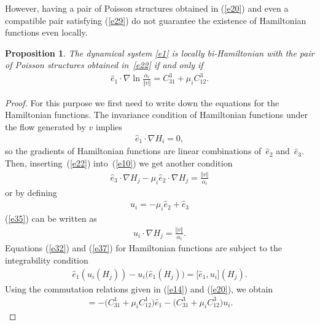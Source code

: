 \documentclass[10pt,a4paper]{amsart}
\numberwithin{equation}{section}
\newtheorem{Proposition}[Theorem]{Proposition}
 { \theoremstyle{definition}
\newtheorem{Definition}[Theorem]{Definition} }
\begin{document}
However, having a pair of Poisson structures obtained in (\ref{e20}) and even a compatible pair satisfying (\ref{e29}) do not guarantee the existence of Hamiltonian functions even locally.

\begin{Proposition}\label{proposition3}
The dynamical system \eqref{e1} is locally bi-Hamiltonian with the pair of Poisson structures obtained in~\eqref{e22} if and only if
\begin{gather}
\widehat{e}_{1}\cdot \nabla \ln \frac{\alpha _{i}}{\Vert v\Vert }=C_{31}^{3}+\mu _{i}C_{12}^{3}. \label{e31}
\end{gather}
\end{Proposition}

\begin{proof}
For this purpose we f\/irst need to write down the equations for the Hamiltonian functions. The invariance condition of Hamiltonian functions under the f\/low generated by $v$ implies
\begin{gather}
\widehat{e}_{1}\cdot \nabla H_{i}=0, \label{e32}
\end{gather}
so the gradients of Hamiltonian functions are linear combinations of~$\widehat{e}_{2}$ and~$\widehat{e}_{3}$. Then, inser\-ting~(\ref{e22}) into~(\ref{e10}) we get another condition
\begin{gather}
\widehat{e}_{3}\cdot \nabla H_{j}-\mu _{i}\widehat{e}_{2}\cdot \nabla H_{j}=\frac{ \Vert v \Vert }{\alpha _{i}} \label{e35}
\end{gather}
or by def\/ining
\begin{gather*}
u_{i}=-\mu _{i}\widehat{e}_{2}+\widehat{e}_{3}
\end{gather*}
(\ref{e35}) can be written as
\begin{gather}
u_{i}\cdot \nabla H_{j}=\frac{\Vert v\Vert }{\alpha _{i}}.\label{e37}
\end{gather}
Equations (\ref{e32}) and (\ref{e37}) for Hamiltonian functions are subject to the integrability condition
\begin{gather*}
\widehat{e}_{1} ( u_{i}(H_{j}) ) -u_{i}\big( \widehat{e}_{1}(H_{j}) \big) =\big[ \widehat{e}_{1},u_{i}\big](H_{j}).
\end{gather*}
Using the commutation relations given in (\ref{e14}) and (\ref{e20}), we obtain
\begin{gather}
[ \widehat{e}_{1},u_{i}] =-\big( C_{31}^{1}+\mu_{i}C_{12}^{1}\big) \widehat{e}_{1}-\big(C_{31}^{3}+\mu_{i}C_{12}^{3}\big) u_{i}. \label{e40}
\end{gather}

\end{proof}
\end{document}
